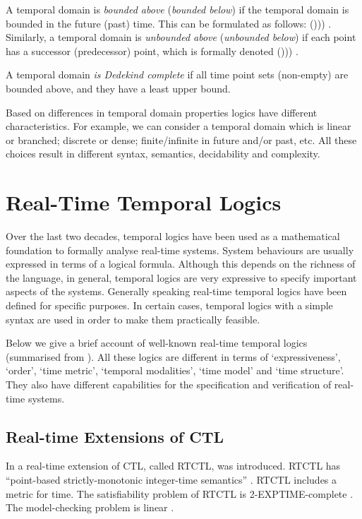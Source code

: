 \documentclass[11pt]{article}
\begin{document}
A temporal domain is \emph{bounded above} (\emph{bounded below}) if the temporal domain is bounded in the future (past) time. This can be formulated as follows:  ())) \cite{Spr02}. Similarly, a temporal domain is \emph{unbounded above} (\emph{unbounded below}) if each point has a successor (predecessor) point, which is formally denoted    ())) \cite{Spr02}. 

A temporal domain \emph{is Dedekind complete} if all time point sets (non-empty) are bounded above, and they have a least upper bound.

Based on differences in temporal domain properties logics have different characteristics. For example, we can consider a temporal domain which is linear or branched; discrete or dense; finite/infinite in future and/or past, etc. All these choices result in different syntax, semantics, decidability and complexity. 

\section{Real-Time Temporal Logics}

Over the last two decades, temporal logics have been used as a mathematical foundation to formally analyse real-time systems. System behaviours are usually expressed in terms of a logical formula. Although this depends on the richness of the language, in general, temporal logics are very expressive to specify important aspects of the systems. Generally speaking real-time temporal logics have been defined for specific purposes. In certain cases, temporal logics with a simple syntax are used in order to make them practically feasible. 

Below we give a brief account of well-known real-time temporal logics (summarised from \cite{Ost92,AHT92,BMN00}). All these logics are different in terms of `expressiveness', `order', `time metric', `temporal modalities', `time model' and `time structure'. They also have different capabilities for the specification and verification of real-time systems.

\subsection{Real-time Extensions of CTL}

In \cite{EMSS89} a real-time extension of CTL, called RTCTL, was introduced. RTCTL has ``point-based strictly-monotonic integer-time semantics'' \cite{AHT92}. RTCTL includes a metric for time. The satisfiability problem of RTCTL is 2-EXPTIME-complete \cite{EMSS89}. The model-checking problem is linear \cite{EMSS89}.
\end{document}
